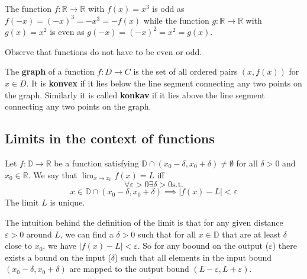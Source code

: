 \begin{example}
    The function $f: \mathbb{R} \to \mathbb{R}$ with $f(x) = x^3$ is odd as $f(-x) = (-x)^3 = -x^3 = -f(x)$ while the function $g: \mathbb{R} \to \mathbb{R}$ with $g(x) = x^2$ is even as $g(-x) = (-x)^2 = x^2 = g(x)$.
\end{example}

\begin{remark}
    Observe that functions do not have to be even or odd.
\end{remark}

\begin{definition}
    The \textbf{graph} of a function $f: D \to C$ is the set of all ordered pairs $(x, f(x))$ for $x \in D$. It is \textbf{konvex} if it lies below the line segment connecting any two points on the graph. Similarly it is called \textbf{konkav} if it lies above the line segment connecting any two points on the graph.
\end{definition}

\subsection{Limits in the context of functions}

\begin{definition}
    Let $f: \mathbb{D} \to \mathbb{R}$ be a function satisfying $\mathbb{D} \cap (x_0 - \delta, x_0 + \delta) \neq \emptyset$ for all $\delta > 0$ and $x_0 \in \mathbb{R}$. We say that $\lim_{x \to x_0} f(x) = L$ iff 
    $$\forall \varepsilon > 0 \exists \delta > 0  \text{s.t.}$$
    $$x \in \mathbb{D} \cap (x_0 - \delta, x_0 + \delta) \implies |f(x) - L| < \varepsilon$$
    The limit $L$ is unique.
\end{definition}

\begin{remark}
    The intuition behind the definition of the limit is that for any given distance $\varepsilon > 0$ around $L$, 
    we can find a $\delta > 0$ such that for all $x \in \mathbb{D}$ that are at least $\delta$ close to $x_0$, we have $|f(x) - L| < \varepsilon$. 
    So for any boound on the output ($\varepsilon$) there exists a bound on the input ($\delta$) such that all elements in the input bound $(x_0 - \delta, x_0 + \delta)$ are mapped to the output bound $(L - \varepsilon, L + \varepsilon)$.
\end{remark}

